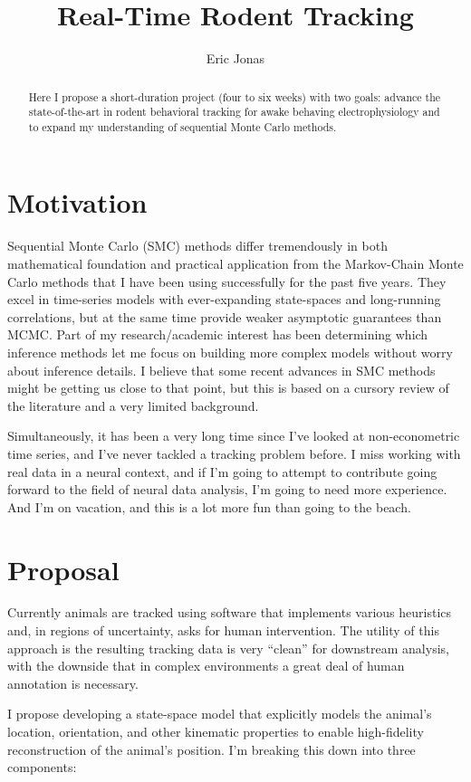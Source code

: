 \documentclass{article}
\title{Real-Time Rodent Tracking}
\author{Eric Jonas}
\begin{document}
\maketitle

\begin{abstract}
Here I propose a short-duration project (four to six weeks) with two
goals: advance the state-of-the-art in rodent behavioral tracking for
awake behaving electrophysiology and to expand my understanding of
sequential Monte Carlo methods.
\end{abstract}


\section{Motivation}
Sequential Monte Carlo (SMC) methods differ tremendously in both
mathematical foundation and practical application from the
Markov-Chain Monte Carlo methods that I have been using successfully
for the past five years. They excel in time-series models with
ever-expanding state-spaces and long-running correlations, but at the
same time provide weaker asymptotic guarantees than MCMC. Part of my
research/academic interest has been determining which inference
methods let me focus on building more complex models without worry
about inference details. I believe that some recent advances in SMC
methods might be getting us close to that point, but this is
based on a cursory review of the literature and a very limited
background.

Simultaneously, it has been a very long time since I've looked at
non-econometric time series, and I've never tackled a tracking problem
before. I miss working with real data in a neural context, and if I'm
going to attempt to contribute going forward to the field of neural
data analysis, I'm going to need more experience. And I'm on vacation,
and this is a lot more fun than going to the beach.

\section{Proposal}

Currently animals are tracked using software that implements various
heuristics and, in regions of uncertainty, asks for human
intervention. The utility of this approach is the resulting tracking
data is very ``clean'' for downstream analysis, with the downside that
in complex environments a great deal of human annotation is necessary.

I propose developing a state-space model that explicitly models the
animal's location, orientation, and other kinematic properties to
enable high-fidelity reconstruction of the animal's position. I'm
breaking this down into three components:
\end{document}
